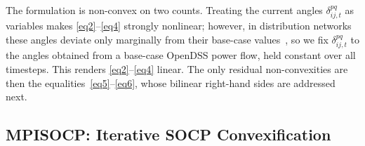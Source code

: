 The formulation is non-convex on two counts. Treating the current
angles $\delta^{pq}_{ij,t}$ as variables makes
\eqref{eq2}--\eqref{eq4} strongly nonlinear; however, in distribution
networks these angles deviate only marginally from their base-case
values~\cite{XX}, so we fix $\delta^{pq}_{ij,t}$ to the angles obtained
from a base-case OpenDSS power flow, held constant over all timesteps.
This renders \eqref{eq2}--\eqref{eq4} linear. The only residual
non-convexities are then the equalities~\eqref{eq5}--\eqref{eq6}, whose
bilinear right-hand sides are addressed next.

\subsection{MPISOCP: Iterative SOCP Convexification}
\label{ssec:mpisocp}


